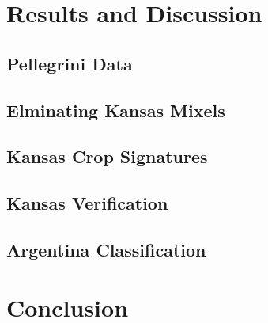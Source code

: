 \documentclass[draft,compress]{beamer}
\begin{document}
\section{Results and Discussion}

\subsection{Pellegrini Data}

\subsection{Elminating Kansas Mixels}

\subsection{Kansas Crop Signatures}

\subsection{Kansas Verification}

\subsection{Argentina Classification}


\section{Conclusion}
\end{document}
